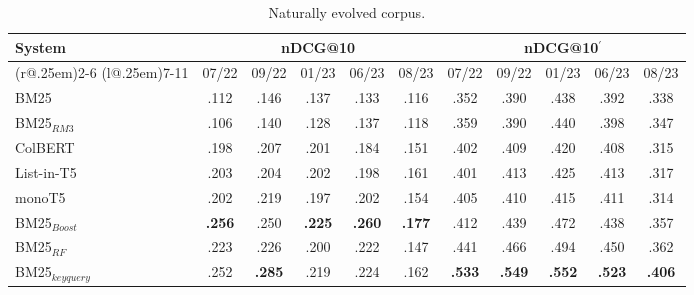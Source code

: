 \begin{table}[t]
\small
\centering
\renewcommand{\tabcolsep}{3.2pt}
\caption{Naturally evolved corpus.}
\label{tab:table-results}

\begin{tabular}{@{}l@{}cccccccccc@{}}
    \toprule
    \bfseries System & \multicolumn{5}{c}{\bfseries nDCG@10} & \multicolumn{5}{c}{\bfseries nDCG@10$^{'}$}\\
    \cmidrule(r@{.25em}){2-6}
    \cmidrule(l@{.25em}){7-11}
    
    & 07/22 & 09/22 & 01/23 & 06/23 & 08/23 & 07/22 & 09/22 & 01/23 & 06/23 & 08/23\\
    
    \midrule

    BM25 & .112 & .146 & .137 & .133 & .116 & .352 & .390 & .438 & .392 & .338 \\
    BM25$_{RM3}$ & .106 & .140 & .128 & .137 & .118 & .359 & .390 & .440 & .398 & .347 \\
    ColBERT & .198 & .207 & .201 & .184 & .151 & .402 & .409 & .420 & .408 & .315 \\
    List-in-T5 & .203 & .204 & .202 & .198 & .161 & .401 & .413 & .425 & .413 & .317 \\
    monoT5 & .202 & .219 & .197 & .202 & .154 & .405 & .410 & .415 & .411 & .314 \\
    
    \midrule
    
    BM25$_{Boost}$ & \bfseries .256 & .250 & \bfseries .225 & \bfseries .260 & \bfseries .177 & .412 & .439 & .472 & .438 & .357 \\
    BM25$_{RF}$ & .223 & .226 & .200 & .222 & .147 & .441 & .466 & .494 & .450 & .362 \\
    BM25$_{keyquery}$ & .252 & \bfseries .285 & .219 & .224 & .162 & \bfseries .533 & \bfseries .549 & \bfseries .552 & \bfseries .523 & \bfseries .406 \\

\bottomrule
\end{tabular}
\end{table}
